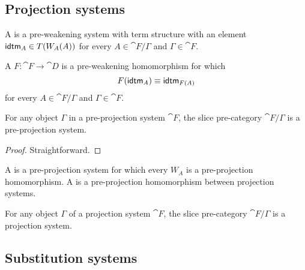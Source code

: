 \subsection{Projection systems}
\begin{defn}
A  is a pre-weakening system with term structure with an element
$\tfid{A}\in T(W_A(A))$ for every $A\in\cat{F}/\Gamma$ and $\Gamma\in\cat{F}$. 
\end{defn}

\begin{defn}
A  $F:\cat{F}\to\cat{D}$ is a pre-weakening homomorphism for which
\begin{equation*}
F(\tfid{A})\jdeq \tfid{F(A)}
\end{equation*}
for every $A\in\cat{F}/\Gamma$ and $\Gamma\in\cat{F}$.
\end{defn}

\begin{lem}
For any object $\Gamma$ in a pre-projection system $\cat{F}$, the slice pre-category
$\cat{F}/\Gamma$ is a pre-projection system.
\end{lem}

\begin{proof}
Straightforward.
\end{proof}

\begin{defn}
A  is a pre-projection system for which every $W_A$ is
a pre-projection homomorphism. A  is a pre-projection homomorphism
between projection systems.
\end{defn}

\begin{cor}
For any object $\Gamma$ of a projection system $\cat{F}$, the slice pre-category $\cat{F}/\Gamma$
is a projection system.
\end{cor}


\subsection{Substitution systems}

